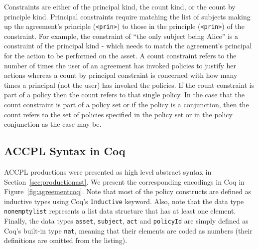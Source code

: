 \documentclass[conference]{IEEEtran}
\newcommand{\syn}{\texttt}
\begin{document}
Constraints are either of the principal kind, the count kind, or the
count by principle kind. 
Principal constraints require matching the list of subjects making up
the agreement's principle (\syn{<prin>}) to those in the principle (\syn{<prin>}) of the
constraint.
%
For example, the constraint of ``the only subject being Alice'' is a
constraint of the principal kind - which needs to match the agreement's principal for the action to be performed on the asset. A count constraint refers to the
number of times the user of an agreement has invoked policies to
justify her actions whereas a count by principal constraint is
concerned with how many times a principal (not the user) has invoked
the policies.  If the count constraint is part of a policy then the
count refers to that single policy. In the case that the count
constraint is part of a policy set or if the policy is a conjunction,
then the count refers to the set of policies specified in the policy
set or in the policy conjunction as the case may be.

\subsection{ACCPL Syntax in Coq}\label{sec:agreementConstructor}

\ac{ACCPL} productions were presented as high level abstract syntax in
Section~\ref{sec:productionast}. We present the corresponding
encodings in Coq in Figure~\ref{fig:agreementcoq}. Note that most of
the policy constructs are defined as inductive types using Coq's
\syn{Inductive} keyword. Also, note that the data type
\syn{nonemptylist} represents a list data structure that has at least
one element. Finally, the data types \syn{asset}, \syn{subject},
\syn{act} and \syn{policyId} are simply defined as Coq's built-in type
\syn{nat}, meaning that their elements are coded as numbers (their
definitions are omitted from the listing).
\end{document}
